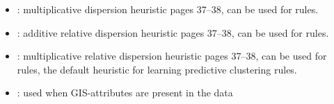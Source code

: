 \begin{itemize}
\begin{itemize}
\begin{itemize}
                    \item {}: multiplicative dispersion heuristic \cite{Zenko07} pages 37--38, can be used for rules.
                    \item {}: additive relative dispersion heuristic \cite{Zenko07} pages 37--38, can be used for rules.
                    \item {}: multiplicative relative dispersion heuristic \cite{Zenko07} pages 37--38, can be used for rules, the default heuristic for learning predictive clustering rules.
                    \item {}: used when GIS-attributes are present in the data
                \end{itemize}
           \end{itemize}
\end{itemize}
